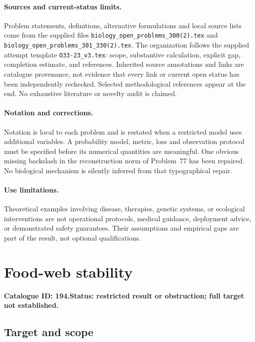 \documentclass[11pt]{article}
\begin{document}
\paragraph{Sources and current-status limits.}
Problem statements, definitions, alternative formulations and local source lists
come from the supplied files
\texttt{biology\_open\_problems\_300(2).tex} and
\texttt{biology\_open\_problems\_301\_330(2).tex}.
The organization follows the supplied attempt template
\texttt{O33-23\_v3.tex}: scope, substantive calculation, explicit gap,
completion estimate, and references. Inherited source annotations and links are
catalogue provenance, not evidence that every link or current open status has
been independently rechecked. Selected methodological references appear at the
end. No exhaustive literature or novelty audit is claimed.

\paragraph{Notation and corrections.}
Notation is local to each problem and is restated when a restricted model uses
additional variables. A probability model, metric, loss and observation protocol
must be specified before its numerical quantities are meaningful. One obvious
missing backslash in the reconstruction norm of Problem~77 has been repaired.
No biological mechanism is silently inferred from that typographical repair.

\paragraph{Use limitations.}
Theoretical examples involving disease, therapies, genetic systems, or ecological
interventions are not operational protocols, medical guidance, deployment advice,
or demonstrated safety guarantees. Their assumptions and empirical gaps are part
of the result, not optional qualifications.

\setcounter{section}{193}
\section{Food-web stability}
\label{prob:194}
\noindent\textbf{Catalogue ID: 194.}\quad \textbf{Status: restricted result or obstruction; full target not established.}
\subsection{Target and scope}
\end{document}
